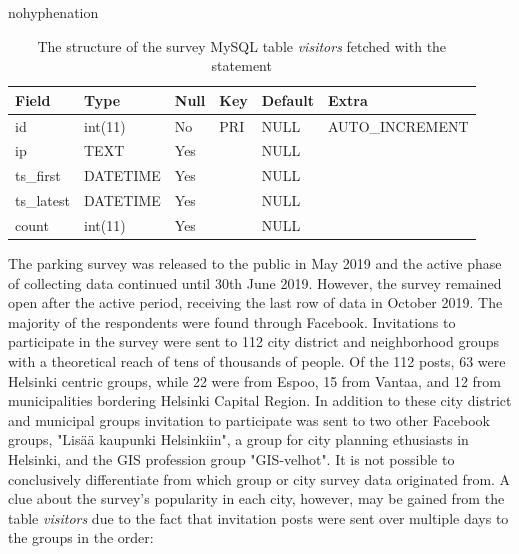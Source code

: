 \begin{hyphenrules}{nohyphenation}
    \begin{table}[H]
        \centering
        \setlength\tabcolsep{1.2ex}
        \caption[Structure of MySQL table visitors]{The structure of the survey MySQL table \textit{visitors} fetched with the statement } 
        \label{tab:mysql_visitors_str}
        \begin{tabular}{ @{} >{\raggedright\arraybackslash}p{2cm} >{\raggedright\arraybackslash}p{2cm} >{\raggedright\arraybackslash}p{1cm} >{\raggedright\arraybackslash}p{1cm} >{\raggedright\arraybackslash}p{1.5cm} >{\raggedleft\arraybackslash}p{4cm} @{} }
            \toprule
            Field & Type & Null & Key & Default & Extra \\
            \midrule
            id & int(11) & No & PRI & NULL & AUTO\_INCREMENT \\
            ip & TEXT & Yes & & NULL & \\
            ts\_first & DATETIME & Yes & & NULL & \\
            ts\_latest & DATETIME & Yes & & NULL & \\
            count & int(11) & Yes & & NULL & \\        
            \bottomrule
        \end{tabular}
    \end{table} 
\end{hyphenrules}

The parking survey was released to the public in May 2019 and the active phase of collecting data continued until 30th June 2019. However, the survey remained open after the active period, receiving the last row of data in October 2019. The majority of the respondents were found through Facebook. Invitations to participate in the survey were sent to 112 city district and neighborhood groups with a theoretical reach of tens of thousands of people. Of the 112 posts, 63 were Helsinki centric groups, while 22 were from Espoo, 15 from Vantaa, and 12 from municipalities bordering Helsinki Capital Region. In addition to these city district and municipal groups invitation to participate was sent to two other Facebook groups, "Lisää kaupunki Helsinkiin", a group for city planning ethusiasts in Helsinki, and the GIS profession group "GIS-velhot". It is not possible to conclusively differentiate from which group or city survey data originated from. A clue about the survey's popularity in each city, however, may be gained from the table \textit{visitors} due to the fact that invitation posts were sent over multiple days to the groups in the order: 

